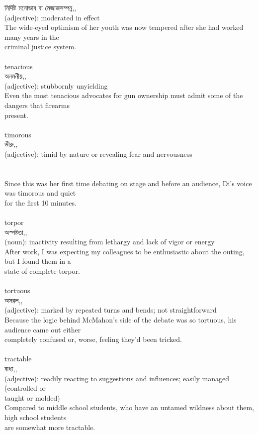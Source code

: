 \documentclass{article}
\begin{document}
{নির্দিষ্ট মনোভাব বা মেজাজসম্পন্ন,,}\\
{(adjective): moderated in effect\\The wide-eyed optimism of her youth was now tempered after she had worked many years in the\\criminal justice system.\\}\\
{tenacious}\\
{অনমনীয়,,}\\
{(adjective): stubbornly unyielding\\Even the most tenacious advocates for gun ownership must admit some of the dangers that firearms\\present.\\}\\
{timorous}\\
{ভীরু,,}\\
{(adjective): timid by nature or revealing fear and nervousness\\\\                                                                               \\Since this was her first time debating on stage and before an audience, Di's voice was timorous and quiet\\for the first 10 minutes.\\}\\
{torpor}\\
{অস্পষ্টতা,,}\\
{(noun): inactivity resulting from lethargy and lack of vigor or energy\\After work, I was expecting my colleagues to be enthusiastic about the outing, but I found them in a\\state of complete torpor.\\}\\
{tortuous}\\
{অসরল,,}\\
{(adjective): marked by repeated turns and bends; not straightforward\\Because the logic behind McMahon's side of the debate was so tortuous, his audience came out either\\completely confused or, worse, feeling they'd been tricked.\\}\\
{tractable}\\
{বাধ্য,,}\\
{(adjective): readily reacting to suggestions and influences; easily managed (controlled or\\taught or molded)\\Compared to middle school students, who have an untamed wildness about them, high school students\\are somewhat more tractable.\\}\\
\end{document}
